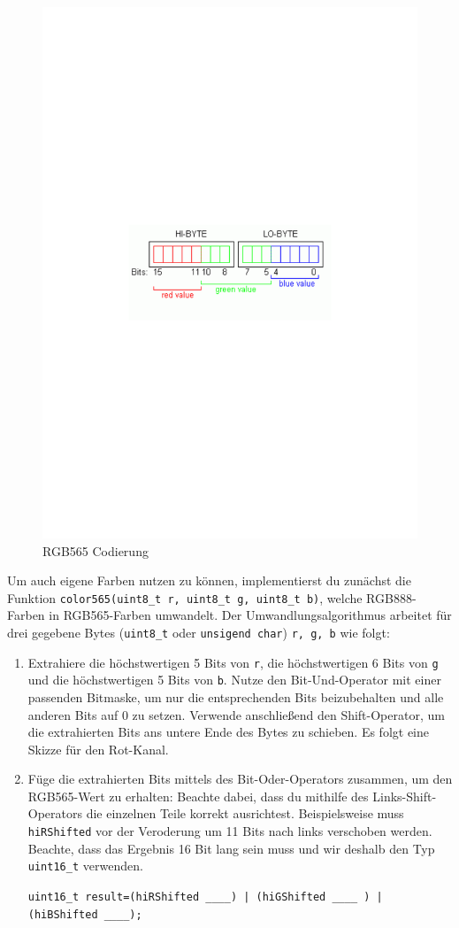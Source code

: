 \begin{figure}[!htb]
    \begin{centering}
        \includegraphics[width=.5\textwidth]{./05_c/figures/rgb565}
        \caption{RGB565 Codierung}
        \label{fig:rgb565}
    \end{centering}
\end{figure}
%
Um auch eigene Farben nutzen zu können, implementierst du zunächst die Funktion \lstinline|color565(uint8_t r, uint8_t g, uint8_t b)|, welche RGB888-Farben in RGB565-Farben umwandelt.
Der Umwandlungsalgorithmus arbeitet für drei gegebene Bytes (\lstinline|uint8_t| oder \lstinline|unsigend char|) \lstinline|r, g, b| wie folgt:
\begin{enumerate}
\item 
Extrahiere die höchstwertigen 5 Bits von \lstinline|r|, die höchstwertigen 6 Bits von \lstinline|g| und die höchstwertigen 5 Bits von \lstinline|b|.
Nutze den Bit-Und-Operator mit einer passenden Bitmaske, um nur die entsprechenden Bits beizubehalten und alle anderen Bits auf 0 zu setzen.
Verwende anschließend den Shift-Operator, um die extrahierten Bits ans untere Ende des Bytes zu schieben.
Es folgt eine Skizze für den Rot-Kanal.


\item 
Füge die extrahierten Bits mittels des Bit-Oder-Operators zusammen, um den RGB565-Wert zu erhalten:
Beachte dabei, dass du mithilfe des Links-Shift-Operators die einzelnen Teile korrekt ausrichtest.
Beispielsweise muss \lstinline|hiRShifted| vor der Veroderung um 11 Bits nach links verschoben werden.
Beachte, dass das Ergebnis 16 Bit lang sein muss und wir deshalb den Typ \lstinline|uint16_t| verwenden.

\lstinline$uint16_t result=(hiRShifted ____) | (hiGShifted ____ ) | (hiBShifted ____);$
\end{enumerate}

